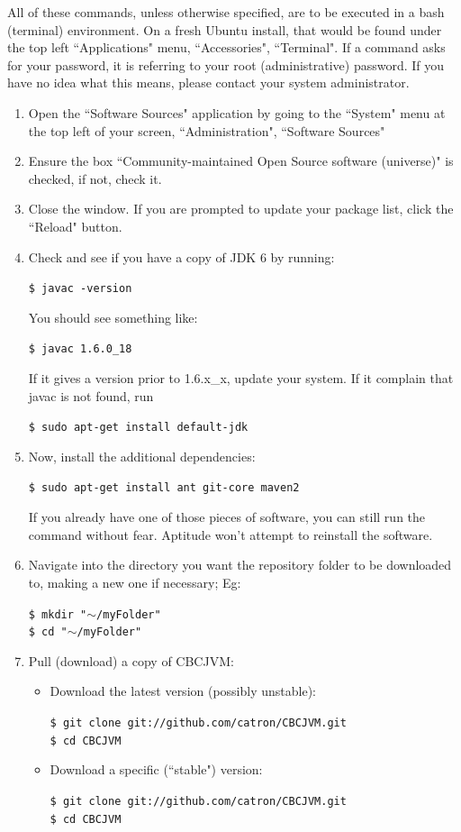 \documentclass[12pt,letterpaper]{article}
\newcommand{\code}[1]{\par\texttt{#1}\par}
\begin{document}
All of these commands, unless otherwise specified, are to be executed in a bash (terminal) environment. On a fresh Ubuntu install, that would be found under the top left ``Applications" menu, ``Accessories", ``Terminal". If a command asks for your password, it is referring to your root (administrative) password. If you have no idea what this means, please contact your system administrator.
\begin{enumerate}
\item Open the ``Software Sources" application by going to the ``System" menu at the top left of your screen, ``Administration", ``Software Sources"
\item Ensure the box ``Community-maintained Open Source software (universe)" is checked, if not, check it.
\item Close the window. If you are prompted to update your package list, click the ``Reload" button.
\item Check and see if you have a copy of JDK 6 by running:
      \code{\$ javac -version}
      You should see something like:
      \code{\$ javac 1.6.0{\_}18}
      If it gives a version prior to 1.6.x{\_}x, update your system. If it complain that javac is not found, run
      \code{\$ sudo apt-get install default-jdk}
\item Now, install the additional dependencies:
      \code{\$ sudo apt-get install ant git-core maven2}
      If you already have one of those pieces of software, you can still run the command without fear. Aptitude won't attempt to reinstall the software.
\item Navigate into the directory you want the repository folder to be downloaded to, making a new one if necessary; Eg:
      \code{\$ mkdir "$\mathtt{\sim}$/myFolder"\\
            \$ cd "$\mathtt{\sim}$/myFolder"}
\item Pull (download) a copy of CBCJVM:\par
      \begin{itemize}
          \item Download the latest version (possibly unstable):
                \code{\$ git clone git://github.com/catron/CBCJVM.git \\
                      \$ cd CBCJVM}
          \item Download a specific (``stable") version:
                \code{\$ git clone git://github.com/catron/CBCJVM.git \\
                      \$ cd CBCJVM \\
}
\end{itemize}
\end{enumerate}
\end{document}
